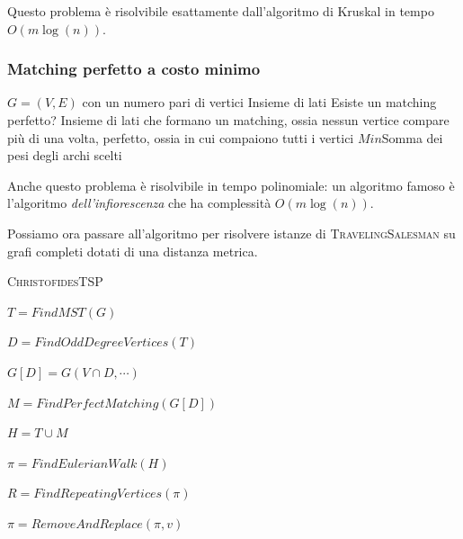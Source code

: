 Questo problema è risolvibile esattamente dall'algoritmo di Kruskal in tempo  $O(m\log(n))$.

\subsubsection{Matching perfetto a costo minimo}

 {$G = (V,E)$ con un numero pari di vertici}
{Insieme di lati}
{Esiste un matching perfetto?}
{Insieme di lati che formano un matching, ossia nessun vertice compare più di una volta, perfetto,
	ossia in cui compaiono tutti i vertici}
{$Min$}{Somma dei pesi degli archi scelti}

Anche questo problema è risolvibile in tempo polinomiale: un algoritmo famoso è
l'algoritmo \textit{dell'infiorescenza} che ha complessità $O(m \log(n))$.

\noindent
Possiamo ora passare all'algoritmo per risolvere istanze di \textsc{TravelingSalesman} su grafi
completi dotati di una distanza metrica.
\begin{algorithm}
	\caption{\textsc{ChristofidesTSP}}

	$T = FindMST(G)$

	$D = FindOddDegreeVertices(T)$

	$G[D] = G(V \cap D, \cdots)$

	$M = FindPerfectMatching(G[D])$

	$ H = T \cup M$

	$\pi = FindEulerianWalk(H)$

	$R = FindRepeatingVertices(\pi)$

	{
		$\pi = RemoveAndReplace(\pi, v)$
	}

	\Return{$\pi$}
\end{algorithm}

